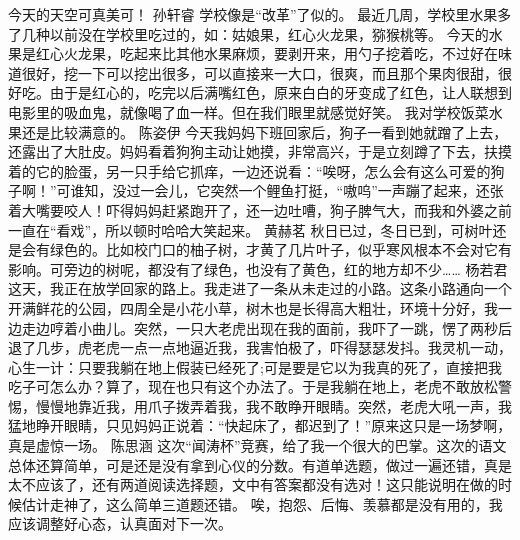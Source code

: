 {}今天的天空可真美可！ \markdownRendererInterblockSeparator
{}\markdownRendererInterblockSeparator
{}孙轩睿\markdownRendererInterblockSeparator
{}学校像是“改革”了似的。\markdownRendererInterblockSeparator
{}最近几周，学校里水果多了几种以前没在学校里吃过的，如：姑娘果，红心火龙果，猕猴桃等。\markdownRendererInterblockSeparator
{}今天的水果是红心火龙果，吃起来比其他水果麻烦，要剥开来，用勺子挖着吃，不过好在味道很好，挖一下可以挖出很多，可以直接来一大口，很爽，而且那个果肉很甜，很好吃。由于是红心的，吃完以后满嘴红色，原来白白的牙变成了红色，让人联想到电影里的吸血鬼，就像喝了血一样。但在我们眼里就感觉好笑。\markdownRendererInterblockSeparator
{}我对学校饭菜水果还是比较满意的。\markdownRendererInterblockSeparator
{}\markdownRendererInterblockSeparator
{}陈姿伊\markdownRendererInterblockSeparator
{}今天我妈妈下班回家后，狗子一看到她就蹭了上去，还露出了大肚皮。妈妈看着狗狗主动让她摸，非常高兴，于是立刻蹲了下去，扶摸着的它的脸蛋，另一只手给它抓痒，一边还说看：“唉呀，怎么会有这么可爱的狗子啊！”可谁知，没过一会儿，它突然一个鲤鱼打挺，“嗷呜”一声蹦了起来，还张着大嘴要咬人！吓得妈妈赶紧跑开了，还一边吐嘈，狗子脾气大，而我和外婆之前一直在“看戏”，所以顿时哈哈大笑起来。 \markdownRendererInterblockSeparator
{}\markdownRendererInterblockSeparator
{}黄赫茗\markdownRendererInterblockSeparator
{}秋日已过，冬日已到，可树叶还是会有绿色的。比如校门口的柚子树，才黄了几片叶子，似乎寒风根本不会对它有影响。可旁边的树呢，都没有了绿色，也没有了黄色，红的地方却不少……\markdownRendererInterblockSeparator
{}\markdownRendererInterblockSeparator
{}杨若君\markdownRendererInterblockSeparator
{}这天，我正在放学回家的路上。我走进了一条从未走过的小路。这条小路通向一个开满鲜花的公园，四周全是小花小草，树木也是长得高大粗壮，环境十分好，我一边走边哼着小曲儿。突然，一只大老虎出现在我的面前，我吓了一跳，愣了两秒后退了几步，虎老虎一点一点地逼近我，我害怕极了，吓得瑟瑟发抖。我灵机一动，心生一计：只要我躺在地上假装已经死了;可是要是它以为我真的死了，直接把我吃子可怎么办？算了，现在也只有这个办法了。于是我躺在地上，老虎不敢放松警惕，慢慢地靠近我，用爪子拨弄着我，我不敢睁开眼睛。突然，老虎大吼一声，我猛地睁开眼睛，只见妈妈正说着：“快起床了，都迟到了！”原来这只是一场梦啊，真是虚惊一场。 \markdownRendererInterblockSeparator
{}\markdownRendererInterblockSeparator
{}陈思涵\markdownRendererInterblockSeparator
{}这次“闻涛杯”竞赛，给了我一个很大的巴掌。这次的语文总体还算简单，可是还是没有拿到心仪的分数。有道单选题，做过一遍还错，真是太不应该了，还有两道阅读选择题，文中有答案都没有选对！这只能说明在做的时候估计走神了，这么简单三道题还错。 唉，抱怨、后悔、羡慕都是没有用的，我应该调整好心态，认真面对下一次。\markdownRendererInterblockSeparator
